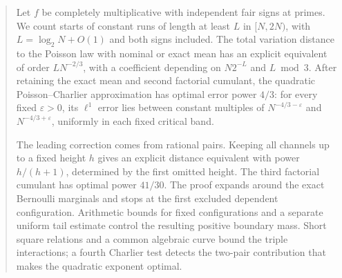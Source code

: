 \begin{abstract}
Let \(f\) be completely multiplicative with independent fair signs
at primes. We count starts of constant runs of length at least
\(L\) in \([N,2N)\), with \(L=\log_2N+O(1)\) and both signs
included. The total variation distance to the Poisson law with
nominal or exact mean has an explicit equivalent of order
\(LN^{-2/3}\), with a coefficient depending on \(N2^{-L}\) and
\(L\bmod3\). After retaining the exact mean and second factorial
cumulant, the quadratic Poisson--Charlier approximation has optimal
error power \(4/3\): for every fixed \(\varepsilon>0\), its
\(\ell^1\) error lies between constant multiples of
\(N^{-4/3-\varepsilon}\) and \(N^{-4/3+\varepsilon}\), uniformly
in each fixed critical band.

The leading correction comes from rational pairs. Keeping all
channels up to a fixed height \(h\) gives an explicit distance
equivalent with power \(h/(h+1)\), determined by the first omitted
height. The third factorial cumulant has optimal power \(41/30\).
The proof expands around the exact Bernoulli marginals and stops at
the first excluded dependent configuration. Arithmetic bounds for
fixed configurations and a separate uniform tail estimate control
the resulting positive boundary mass. Short square relations and
a common algebraic curve bound the triple interactions; a fourth
Charlier test detects the two-pair contribution that makes the
quadratic exponent optimal.
\end{abstract}

